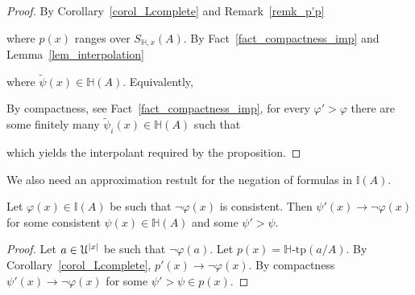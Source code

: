 \documentclass[10pt,oneside]{amsproc}
\begin{document}
\begin{proof}
  By Corollary~\ref{corol_Lcomplete} and Remark~\ref{remk_p'p}


  where $p(x)$ ranges over $S_{\mathds{H},x}(A)$.
  By Fact~\ref{fact_compactness_imp} and Lemma~\ref{lem_interpolation}


  where $\tilde{\psi}(x)\in\mathds{H}(A)$.
  Equivalently,


  By compactness, see Fact~\ref{fact_compactness_imp}, for every $\varphi'>\varphi$ there are some finitely many $\tilde{\psi}_i(x)\in\mathds{H}(A)$ such that


  which yields the interpolant required by the proposition.
\end{proof}

We also need an approximation restult for the negation of formulas in $\mathds{I}(A)$.

\begin{proposition}\label{prop_LHapprox2}
  Let $\varphi(x)\in\mathds{I}(A)$ be such that $\neg\varphi(x)$ is consistent.
  Then  $\psi'(x)\rightarrow\neg\varphi(x)$ for some consistent $\psi(x)\in\mathds{H}(A)$ and some $\psi'>\psi$.
\end{proposition}



\begin{proof}
  Let $a\in {\EuScript U}^{|x|}$ be such that $\neg\varphi(a)$.
  Let $p(x)=\mathds{H}\mbox{-tp}(a/A)$.
  By Corollary~\ref{corol_Lcomplete}, $p'(x)\rightarrow\neg\varphi(x)$. 
  By compactness  $\psi'(x)\rightarrow\neg\varphi(x)$ for some $\psi'>\psi\in p(x)$. 
\end{proof}
\end{document}
